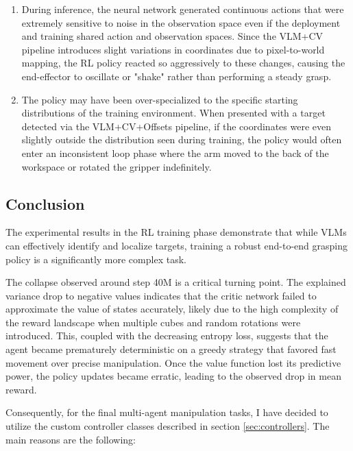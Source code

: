 \begin{enumerate}
	\item During inference, the neural network generated continuous actions that were extremely sensitive to noise in the observation space even if the deployment and training shared action and observation spaces. Since the VLM+CV pipeline introduces slight variations in coordinates due to pixel-to-world mapping, the RL policy reacted so aggressively to these changes, causing the end-effector to oscillate or "shake" rather than performing a steady grasp.
	
	\item The policy may have been over-specialized to the specific starting distributions of the training environment. When presented with a target detected via the VLM+CV+Offsets pipeline, if the coordinates were even slightly outside the distribution seen during training, the policy would often enter an inconsistent loop phase where the arm moved to the back of the workspace or rotated the gripper indefinitely.
\end{enumerate}

\subsection{Conclusion}
The experimental results in the RL training phase demonstrate that while VLMs can effectively identify and localize targets, training a robust end-to-end grasping policy is a significantly more complex task.

The collapse observed around step 40M is a critical turning point. The explained variance drop to negative values indicates that the critic network failed to approximate the value of states accurately, likely due to the high complexity of the reward landscape when multiple cubes and random rotations were introduced. This, coupled with the decreasing entropy loss, suggests that the agent became prematurely deterministic on a greedy strategy that favored fast movement over precise manipulation. Once the value function lost its predictive power, the policy updates became erratic, leading to the observed drop in mean reward.

Consequently, for the final multi-agent manipulation tasks, I have decided to utilize the custom controller classes described in section \ref{sec:controllers}. The main reasons are the following: 

